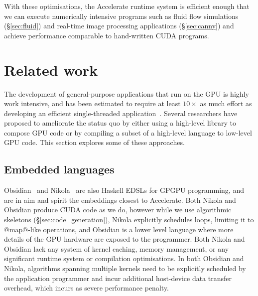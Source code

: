 With these optimisations, the Accelerate runtime system is efficient enough that
we can execute numerically intensive programs such as fluid flow simulations
(\S\ref{sec:fluid}) and real-time image processing applications
(\S\ref{sec:canny}) and achieve performance comparable to hand-written CUDA
programs.


\section{Related work}
\label{sec:implementation_related}

The development of general-purpose applications that run on the GPU is highly
work intensive, and has been estimated to require at least $10\times$ as much
effort as developing an efficient single-threaded
application~\cite{Sweeney:2009ua}. Several researchers have proposed to
ameliorate the status quo by either using a high-level library to compose GPU
code or by compiling a subset of a high-level language to low-level GPU code.
This section explores some of these approaches.


\subsection{Embedded languages}



Obsidian~\cite{Svensson:2008a,Svensson:2013wd} and Nikola~\cite{Mainland:2010vj} are also
Haskell EDSLs for GPGPU programming, and are in aim and spirit the embeddings
closest to Accelerate. Both Nikola and Obsidian produce CUDA code as we do,
however while we use algorithmic skeletons (\S\ref{sec:code_generation}), Nikola
explicitly schedules loops, limiting it to @map@-like operations, and Obsidian
is a lower level language where more details of the GPU hardware are exposed to
the programmer. Both Nikola and Obsidian lack any system of kernel caching,
memory management, or any significant runtime system or compilation
optimisations. In both Obsidian and Nikola, algorithms spanning multiple kernels
need to be explicitly scheduled by the application programmer and incur
additional host-device data transfer overhead, which incurs as severe
performance penalty.

